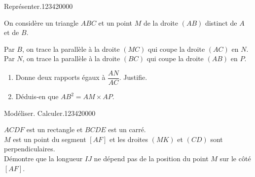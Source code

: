 \begin{pageParcourst}

\begin{ExoCt}{Représenter.}{1234}{2}{0}{0}{0}{0}

On considère un triangle $ABC$ et un point $M$ de la droite $(AB)$
distinct de $A$ et de $B$.
\par Par $B$, on trace la parallèle à la droite $(MC)$ qui coupe la
droite $(AC)$ en $N$. Par $N$, on trace la parallèle à la droite $(BC)$
qui coupe la droite $(AB)$ en $P$.
\begin{enumerate}
  \item Donne deux rapports égaux à $\dfrac{AN}{AC}$. Justifie.
  \item Déduis-en que $AB^2=AM\times AP$.
\end{enumerate}

\end{ExoCt}

\begin{ExoCt}{Modéliser. Calculer.}{1234}{2}{0}{0}{0}{0}
 
 $ACDF$ est un rectangle et $BCDE$ est un carré.\\
 
$M$ est un point du segment $[AF]$ et les droites $(MK)$ et $(CD)$
sont perpendiculaires.\\
 
Démontre que la longueur $IJ$ ne dépend pas de la position du point
$M$ sur le côté $[AF]$.


\end{ExoCt}
 

 
\end{pageParcourst}





